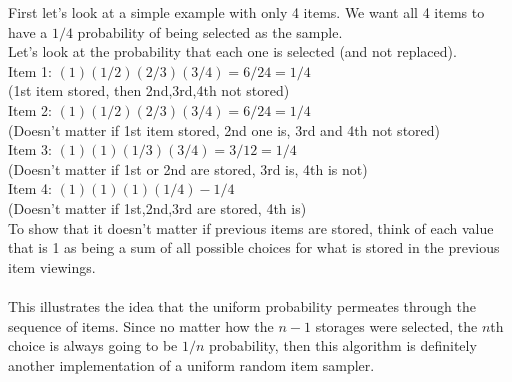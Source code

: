 \documentclass{article}
\begin{document}
First let's look at a simple example with only 4 items. We want all 4 items
to have a $1/4$ probability of being selected as the sample.\\
Let's look at the probability that each one is selected (and not replaced).\\
Item 1: $(1)(1/2)(2/3)(3/4) = 6/24 = 1/4$\\
(1st item stored, then 2nd,3rd,4th not stored)\\
Item 2: $(1)(1/2)(2/3)(3/4) = 6/24 = 1/4$\\
(Doesn't matter if 1st item stored, 2nd one is, 3rd and 4th not stored)\\
Item 3: $(1)(1)(1/3)(3/4) = 3/12 = 1/4$\\
(Doesn't matter if 1st or 2nd are stored, 3rd is, 4th is not)\\
Item 4: $(1)(1)(1)(1/4) - 1/4$\\
(Doesn't matter if 1st,2nd,3rd are stored, 4th is)\\
To show that it doesn't matter if previous items are stored, think
of each value that is 1 as being a sum of all possible choices for what is 
stored in
the previous item viewings.\\\\
This illustrates the idea that the uniform probability permeates through the
sequence of items. Since no matter how the $n-1$ storages were selected, the 
$n$th
choice is always going to be $1/n$ probability, then this algorithm is 
definitely
another implementation of a uniform random item sampler.

\pagebreak

\end{document}
